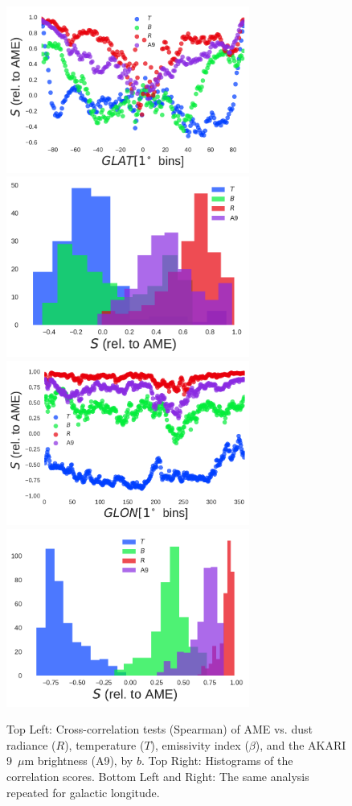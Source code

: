 \documentclass[preprint2,longabstract]{aastex}
\begin{document}
      \begin{figure}
        \label{fig:PlanckModBBvsAMEandA9_bins}
        \includegraphics[width=80mm]{../Plots/PlanckModBBvsAMEandA9_byGLAT.pdf}
        \includegraphics[width=80mm]{../Plots/PlanckModBBvsAMEandA9_GLAT_hist.pdf}
        \includegraphics[width=80mm]{../Plots/PlanckModBBvsAMEandA9_byGLON.pdf}
        \includegraphics[width=80mm]{../Plots/PlanckModBBvsAMEandA9_GLON_hist.pdf}
        \centering
        \caption{Top Left: Cross-correlation tests (Spearman) of AME vs. dust radiance ($R$), temperature ($T$),  emissivity index ($\beta$), and the AKARI 9~$\mu$m brightness (A9), by $b$. Top Right: Histograms of the correlation scores. Bottom Left and Right: The same analysis repeated for galactic longitude. }
      \end{figure}
\end{document}
